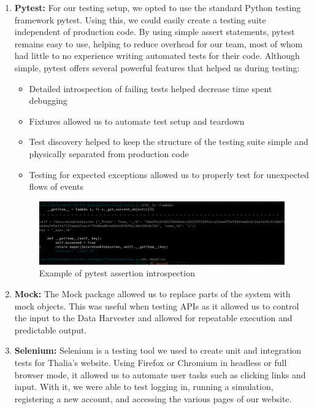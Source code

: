 \documentclass[main.tex]{subfiles}
\begin{document}
\begin{enumerate}
\item \textbf{Pytest\cite{pytest}:}
For our testing setup, we opted to use the standard Python testing framework pytest. Using this, we could easily create a testing suite independent of production code. By using simple assert statements, pytest remains easy to use, helping to reduce overhead for our team, most of whom had little to no experience writing automated tests for their code. Although simple, pytest offers several powerful features that helped us during testing:
\begin{itemize}
\item Detailed introspection of failing tests helped decrease time spent debugging
\item Fixtures allowed us to automate test setup and teardown
\item Test discovery helped to keep the structure of the testing suite simple and physically separated from production code
\item Testing for expected exceptions allowed us to properly test for unexpected flows of events
\end{itemize}


\begin{figure}[H]
   \centering
   \includegraphics[scale=0.3]{06Testing/06Pictures/failedTest.png}
   \caption{Example of pytest assertion introspection}
   \label{Pytest example}
\end{figure}

\item \textbf{Mock\cite{mock}:}
The Mock package allowed us to replace parts of the system with mock objects. This was useful when testing APIs as it allowed us to control the input to the Data Harvester and allowed for repeatable execution and predictable output.

\item \textbf{Selenium\cite{selenium}:}
Selenium is a testing tool we used to create unit and integration tests for Thalia’s website. Using Firefox or Chromium in headless or full browser mode, it allowed us to automate user tasks such as clicking links and input. With it, we were able to test logging in, running a simulation, registering a new account, and accessing the various pages of our website.


\end{enumerate}
\end{document}
